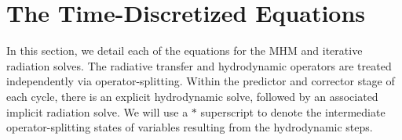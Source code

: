 \documentclass[preprint,12pt]{elsarticle}
\newcommand{\lsec}[1]{\label{sec:#1}}
\newcommand{\half}{\frac{1}{2}}
\newcommand{\fourth}{\frac{1}{4}}
\begin{document}
%
%
%
%
%
%
%

\section{The Time-Discretized Equations}\lsec{full}

In this section, we detail each of the equations for the MHM and iterative radiation
solves.  The radiative transfer and hydrodynamic operators are treated independently via
operator-splitting.  Within the predictor and corrector stage of each cycle, there is an explicit hydrodynamic solve, followed by an associated implicit radiation solve. 
We will use a $*$ superscript to denote the intermediate operator-splitting states of variables resulting
from the hydrodynamic steps. 
\end{document}

